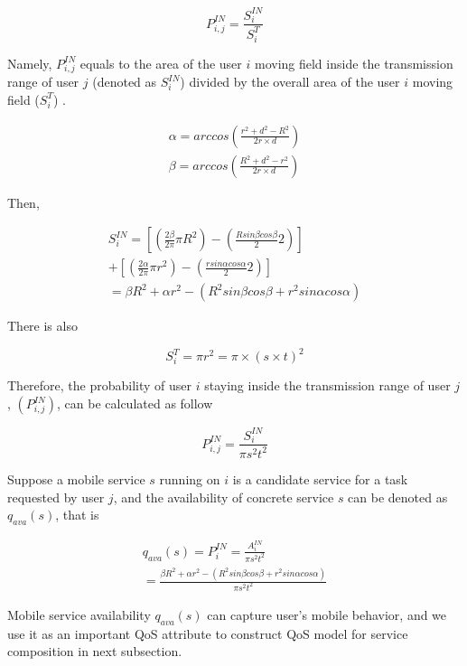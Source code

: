 \documentclass[10pt,journal,compsoc]{IEEEtran}
\begin{document}
\begin{equation}
P_{i,j}^{IN} = \frac{S_i^{IN}}{S_i^T}
\end{equation}

Namely, $P^{IN}_{i,j}$ equals to the area of the user $i$ moving field inside the transmission range of user $j$ (denoted as $S^{IN}_i$) divided by the overall area of the user $i$ moving field ($S^T_i$) \cite{Yang2010}.

\begin{eqnarray}
\alpha = arccos(\frac{r^2+d^2-R^2}{2r\times d}) \\
\beta = arccos(\frac{R^2+d^2-r^2}{2r\times d})
\end{eqnarray}

Then,

\begin{eqnarray}
S^{IN}_i = [(\frac{2\beta}{2\pi}\pi R^2)-(\frac{R sin\beta cos\beta}{2}2)]\\\nonumber
+ [(\frac{2\alpha}{2\pi}\pi r^2)-(\frac{r sin\alpha cos\alpha}{2}2)]\\\nonumber
= \beta R^2 + \alpha r^2 - (R^2 sin\beta cos\beta + r^2 sin\alpha cos\alpha)
\end{eqnarray}

There is also

\begin{equation}
S_i^T = \pi r^2 = \pi \times (s \times t)^2
\end{equation}

Therefore, the probability of user $i$ staying inside the transmission range of user $j$, $(P^{IN}_{i,j})$, can be calculated as follow

\begin{equation}
P_{i,j}^{IN} = \frac{S_i^{IN}}{\pi s^2 t^2}
\end{equation}

Suppose a mobile service $s$ running on $i$ is a candidate service for a task requested by user $j$, and the availability of concrete service $s$ can be denoted as $q_{ava}(s)$, that is

\begin{eqnarray}
q_{ava}(s) = P^{IN}_i = \frac{A_i^{IN}}{\pi s^2 t^2}\\\nonumber
= \frac{\beta R^2 + \alpha r^2 - (R^2 sin\beta cos\beta + r^2 sin\alpha cos\alpha)}{\pi s^2 t^2}
\end{eqnarray}

Mobile service availability $q_{ava}(s)$ can capture user's mobile behavior, and we use it as an important QoS attribute to construct QoS model for service composition in next subsection.
\end{document}
